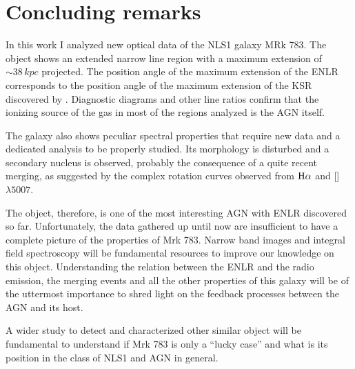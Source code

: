 \documentclass[../main.tex]{subfiles}
\begin{document}
\section{Concluding remarks}
\label{sec:pap3_summary}

In this work I analyzed new optical data of the NLS1 galaxy MRk 783.
The object shows an extended narrow line region with a maximum extension of $\sim 38\,\si{kpc}$ projected.
The position angle of the maximum extension of the ENLR corresponds to the position angle of the maximum extension of the KSR discovered by \citet{Congiu17}.
Diagnostic diagrams and other line ratios confirm that the ionizing source of the gas in most of the regions analyzed is the AGN itself.

The galaxy also shows peculiar spectral properties that require new data and a dedicated analysis to be properly studied.
Its morphology is disturbed and a secondary nucleus is observed, probably the consequence of a quite recent merging, as suggested by the complex rotation curves observed from $\rm H\alpha$ and []$\lambda5007$.

The object, therefore, is one of the most interesting AGN with ENLR discovered so far.
Unfortunately, the data gathered up until now are insufficient to have a complete picture of the properties of Mrk 783.
Narrow band images and integral field spectroscopy will be fundamental resources to improve our knowledge on this object.
Understanding the relation between the ENLR and the radio emission, the merging events and all the other properties of this galaxy will be of the uttermost importance to shred light on the feedback processes between the AGN and its host. 

A wider study to detect and characterized other similar object will be fundamental to understand if Mrk 783 is only a ``lucky case'' and what is its position in the class of NLS1 and AGN in general. 



























\biblio
\end{document}
